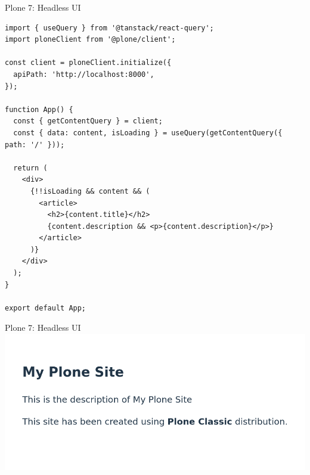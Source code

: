 \documentclass[12pt,aspectratio=169]{beamer}
\begin{document}

\begin{frame}[fragile]{Plone 7: Headless UI}
\tiny
\begin{verbatim}
import { useQuery } from '@tanstack/react-query';
import ploneClient from '@plone/client';

const client = ploneClient.initialize({
  apiPath: 'http://localhost:8000',
});

function App() {
  const { getContentQuery } = client;
  const { data: content, isLoading } = useQuery(getContentQuery({ path: '/' }));

  return (
    <div>
      {!!isLoading && content && (
        <article>
          <h2>{content.title}</h2>
          {content.description && <p>{content.description}</p>}
        </article>
      )}
    </div>
  );
}

export default App;
\end{verbatim}
\end{frame}


\begin{frame}[fragile]{Plone 7: Headless UI}
  \includegraphics[width=0.95\columnwidth]{images/vite.png}
\end{frame}

\end{document}
